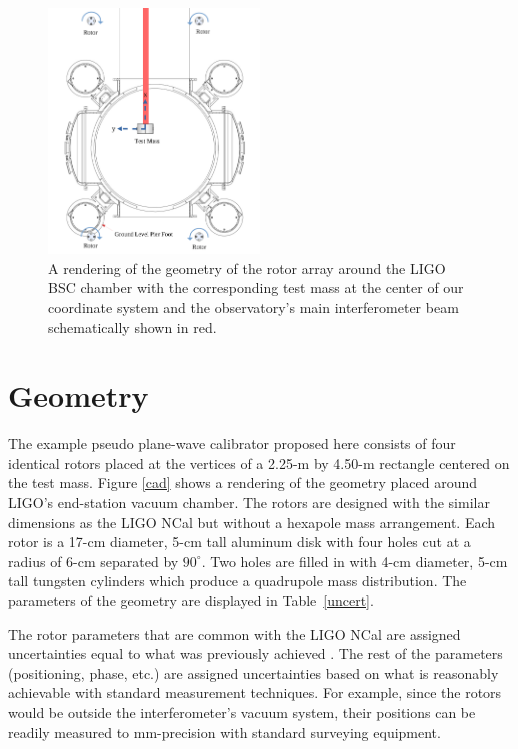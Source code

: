 \documentclass[superscriptaddress, twocolumn, prd]{revtex4-1}
\begin{document}
\begin{figure}[!h]
\centering \includegraphics[width=0.5\textwidth]{Super4BSCTopDownAxesSpinNew.pdf}
\caption{A rendering of the geometry of the rotor array around the LIGO BSC chamber with the corresponding test mass at the center of our coordinate system and the observatory's main interferometer beam schematically shown in red.}
\label{bsc} 
\end{figure}

\section{Geometry}

The example pseudo plane-wave calibrator proposed here consists of four identical rotors placed at the vertices of a 2.25-m by 4.50-m rectangle centered on the test mass. Figure \ref{cad} shows a rendering of the geometry placed around LIGO's end-station vacuum chamber. The rotors are designed with the similar dimensions as the LIGO NCal \cite{ncal} but without a hexapole mass arrangement. Each rotor is a 17-cm diameter, 5-cm tall aluminum disk with four holes cut at a radius of 6-cm separated by $90^\circ$. Two holes are filled in with 4-cm diameter, 5-cm tall  tungsten cylinders which produce a quadrupole mass distribution. The parameters of the geometry are displayed in Table~\ref{uncert}.

The rotor parameters that are common with the LIGO NCal are assigned uncertainties equal to what was previously achieved \cite{ncal}. The rest of the parameters (positioning, phase, etc.) are assigned uncertainties based on what is reasonably achievable with standard measurement techniques. For example, since the rotors would be outside the interferometer's vacuum system, their positions can be readily measured to  mm-precision with standard surveying equipment. \cite{ncal}
\end{document}
